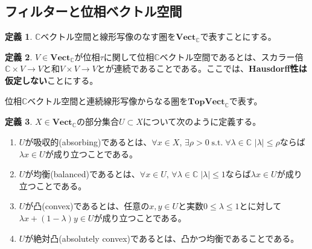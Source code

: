 ﻿\documentclass[12pt]{jsarticle}
\newcommand{\C}{\mathbb{C}}
\newcommand{\Vect}{\textbf{Vect}_{\C}}
\newcommand{\TopVect}{\textbf{TopVect}_{\C}}
\newcommand{\abs}[1]{\left \lvert #1 \right \rvert}%
\theoremstyle{definition}%
\newtheorem{definition}{定義}[section]%
\renewenvironment{leftbar}{%
  \renewcommand\FrameCommand{\vrule width 1pt \hspace{10pt}}%
  \MakeFramed {\advance\hsize-\width \FrameRestore}}
 {\endMakeFramed}
\newenvironment{bardefinition}{ \begin{definition} \begin{leftbar}} {\end{leftbar} \end{definition}}
\begin{document}
\subsection*{フィルターと位相ベクトル空間}
\begin{bardefinition}
$\C$ベクトル空間と線形写像のなす圏を$\Vect$で表すことにする。
\end{bardefinition}


\begin{bardefinition}
  $V \in \Vect$が位相$\tau$に関して位相$\C$ベクトル空間であるとは、スカラー倍$\C \times V \to V$と和$V \times V \to V$とが連続であることである。ここでは、\textbf{Hausdorff性は仮定しない}ことにする。

  位相$\C$ベクトル空間と連続線形写像からなる圏を$\TopVect$で表す。
\end{bardefinition}


\begin{bardefinition}
  $X \in \Vect$の部分集合$U \subset X$について次のように定義する。
  \begin{enumerate}
    \item $U$が吸収的(absorbing)であるとは、$\forall x \in X$, $\exists \rho > 0 \; \text{s.t.} \; \forall \lambda \in \C$ $\abs{\lambda} \leq \rho$ならば$\lambda x \in U$が成り立つことである。
    \item $U$が均衡(balanced)であるとは、$\forall x \in U, \, \forall \lambda \in \C \; \abs{\lambda} \leq 1 \text{ならば} \lambda x \in U$が成り立つことである。
    \item $U$が凸(convex)であるとは、任意の$x,y \in U$と実数$0 \leq \lambda \leq 1$とに対して$\lambda x + (1 - \lambda)y \in U$が成り立つことである。
    \item $U$が絶対凸(absolutely convex)であるとは、凸かつ均衡であることである。
  \end{enumerate}
\end{bardefinition}
\end{document}
